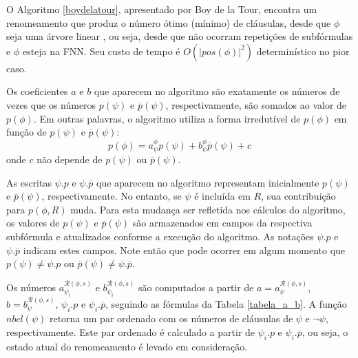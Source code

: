 O Algoritmo \ref{boydelatour}, apresentado por Boy de la Tour, encontra um renomeamento que produz o número ótimo (mínimo) de cláusulas, desde que $\phi$ seja uma árvore linear \cite{de1992optimality}, ou seja, desde que não ocorram repetições de subfórmulas e $\phi$ esteja na FNN. Seu custo de tempo é $O(|pos(\phi)|^2)$ determinístico no pior caso.

Os coeficientes $a$ e $b$ que aparecem no algoritmo são exatamente os números de vezes que os números $p(\psi)$ e $\overline{p}(\psi)$, respectivamente, são somados ao valor de $p(\phi)$. Em outras palavras, o algoritmo utiliza a forma irredutível de $p(\phi)$ em função de $p(\psi)$ e $\overline{p}(\psi)$: $$p(\phi) = a_\psi^\phi p(\psi) + b_\psi^\phi \overline{p}(\psi) + c$$ onde $c$ não depende de $p(\psi)$ ou $\overline{p}(\psi)$.

As escritas $\psi.p$ e $\psi.\overline{p}$ que aparecem no algoritmo representam inicialmente $p(\psi)$ e $\overline{p}(\psi)$, respectivamente. No entanto, se $\psi$ é incluída em $R$, sua contribuição para $p(\phi,R)$ muda. Para esta mudança ser refletida nos cálculos do algoritmo, os valores de $p(\psi)$ e $\overline{p}(\psi)$ são armazenados em campos da respectiva subfórmula e atualizados conforme a execução do algoritmo. As notações $\psi.p$ e $\psi.\overline{p}$ indicam estes campos. Note então que pode ocorrer em algum momento que $p(\psi) \neq \psi.p$ ou $\overline{p}(\psi) \neq \psi.\overline{p}$.

Os números $a_{\psi_i}^{\mathcal{R}(\phi,s)}$ e $b_{\psi_i}^{\mathcal{R}(\phi,s)}$ são computados a partir de $a = a_\psi^{\mathcal{R}(\phi,s)}$, $b = b_\psi^{\mathcal{R}(\phi,s)}$, $\psi_i.p$ e $\psi_i.\overline{p}$, seguindo as fórmulas da Tabela \ref{tabela_a_b}. A função $nbcl(\psi)$ retorna um par ordenado com os números de cláusulas de $\psi$ e $\neg \psi$, respectivamente. Este par ordenado é calculado a partir de $\psi_i.p$ e $\psi_i.\overline{p}$, ou seja, o estado atual do renomeamento é levado em consideração.

